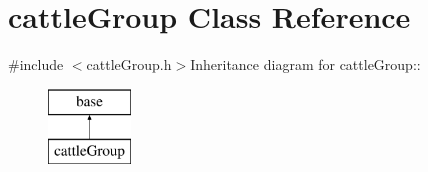 \hypertarget{classcattle_group}{
\section{cattleGroup Class Reference}
\label{classcattle_group}
}


{\ttfamily \#include $<$cattleGroup.h$>$}Inheritance diagram for cattleGroup::\begin{figure}[H]
\begin{center}
\leavevmode
\includegraphics[height=2cm]{classcattle_group}
\end{center}
\end{figure}
